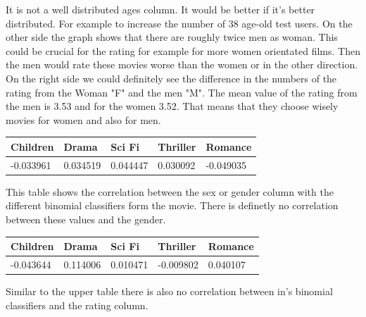 \documentclass[11pt,a4paper]{article}
\begin{document}
\noindent
It is not a well distributed ages column. It would be better if it's better distributed. For example to increase the number of 38 age-old test users. On the other side the graph shows that there are roughly twice men as woman. This could be crucial for the rating for example for more women orientated films. Then the men would rate these movies worse than the women or in the other direction. On the right side we could definitely see the difference in the numbers of the rating from the Woman "F" and the men "M". The mean value of the rating from the men is 3.53 and for the women 3.52. That means that they choose wisely movies for women and also for men.
\begin{center}
\begin{tabular}{|p{2cm}|p{2cm}|p{2cm}|p{2cm}|p{2cm}|}
	\hline
	Children & Drama & Sci Fi & Thriller & Romance  \\ \hline
	-0.033961 & 0.034519 & 0.044447 & 0.030092 & -0.049035 \\
	\hline
\end{tabular}
\end{center}
This table shows the correlation between the sex or gender column with the different binomial classifiers form the movie. There is definetly no correlation between these values and the gender.
\begin{center}
	\begin{tabular}{|p{2cm}|p{2cm}|p{2cm}|p{2cm}|p{2cm}|}
		\hline
		Children & Drama & Sci Fi & Thriller & Romance  \\ \hline
		-0.043644 & 0.114006 & 0.010471 & -0.009802 & 0.040107 \\
		\hline
	\end{tabular}
\end{center}
Similar to the upper table there is also no correlation between in's binomial classifiers and the rating column.

\end{document}
